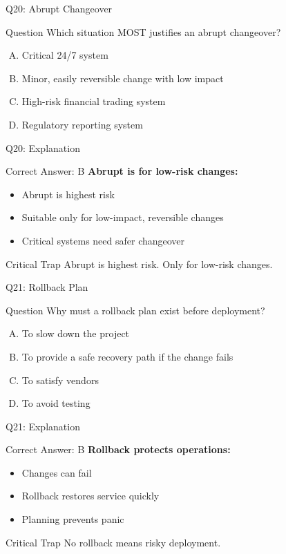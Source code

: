 \documentclass{beamer}
\begin{document}
	\begin{frame}{Q20: Abrupt Changeover}
		\begin{block}{Question}
			Which situation MOST justifies an abrupt changeover?
		\end{block}
		\begin{enumerate}[(A)]
			\item Critical 24/7 system
			\item Minor, easily reversible change with low impact
			\item High-risk financial trading system
			\item Regulatory reporting system
		\end{enumerate}
	\end{frame}
	
	\begin{frame}{Q20: Explanation}
		\begin{block}{Correct Answer: B}
			\textbf{Abrupt is for low-risk changes:}
			\begin{itemize}
				\item Abrupt is highest risk
				\item Suitable only for low-impact, reversible changes
				\item Critical systems need safer changeover
			\end{itemize}
		\end{block}
		\begin{alertblock}{Critical Trap}
			Abrupt is highest risk. Only for low-risk changes.
		\end{alertblock}
	\end{frame}
	
	\begin{frame}{Q21: Rollback Plan}
		\begin{block}{Question}
			Why must a rollback plan exist before deployment?
		\end{block}
		\begin{enumerate}[(A)]
			\item To slow down the project
			\item To provide a safe recovery path if the change fails
			\item To satisfy vendors
			\item To avoid testing
		\end{enumerate}
	\end{frame}
	
	\begin{frame}{Q21: Explanation}
		\begin{block}{Correct Answer: B}
			\textbf{Rollback protects operations:}
			\begin{itemize}
				\item Changes can fail
				\item Rollback restores service quickly
				\item Planning prevents panic
			\end{itemize}
		\end{block}
		\begin{alertblock}{Critical Trap}
			No rollback means risky deployment.
		\end{alertblock}
	\end{frame}
	
\end{document}
